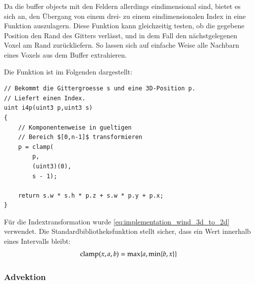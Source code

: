 Da die buffer objects mit den Feldern allerdings eindimensional sind,
bietet es sich an, den Übergang von einem drei- zu einem
eindimensionalen Index in eine Funktion auszulagern. Diese Funktion
kann gleichzeitig testen, ob die gegebene Position den Rand des
Gitters verlässt, und in dem Fall den nächstgelegenen Voxel am Rand
zurückliefern. So lassen sich auf einfache Weise alle Nachbarn eines
Voxels aus dem Buffer extrahieren.

Die Funktion  ist im Folgenden
dargestellt:

\begin{verbatim}
// Bekommt die Gittergroesse s und eine 3D-Position p.
// Liefert einen Index.
uint i4p(uint3 p,uint3 s)
{
    // Komponentenweise in gueltigen
    // Bereich $[0,n-1]$ transformieren
    p = clamp(
        p,
        (uint3)(0),
        s - 1);

    return s.w * s.h * p.z + s.w * p.y + p.x;
}
\end{verbatim}

Für die Indextransformation wurde
\autoref{eq:implementation_wind_3d_to_2d} verwendet.  Die
Standardbibliotheksfunktion  stellt sicher,
dass ein Wert innerhalb eines Intervalls bleibt:
\begin{align}
\textnormal{clamp}(x,a,b) = \max \{ a,\min \{ b,x \} \}
\end{align}

\subsubsection{Advektion}
\label{sec:implementation_wind_advection}

